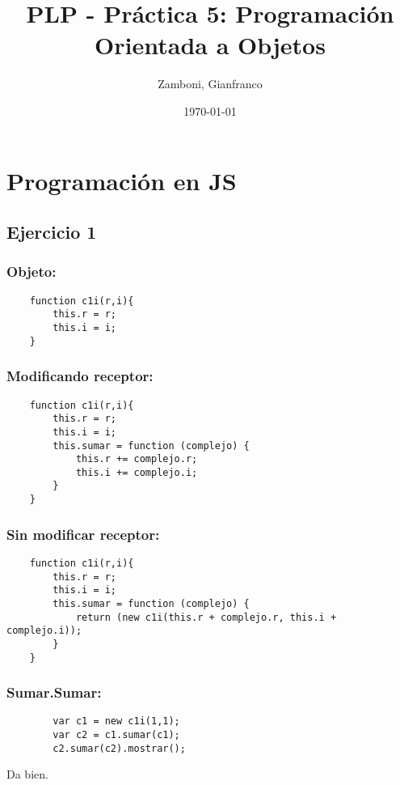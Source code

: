 \documentclass[10pt,a4paper]{article}
\begin{document}
\title{PLP - Práctica 5: Programación Orientada a Objetos}

\date{\today}

\author{Zamboni, Gianfranco}

\maketitle
\setcounter{page}{1}

\section*{\centering Programación en JS}
\subsection{Ejercicio 1}
\subsubsection{Objeto:}
    \begin{lstlisting}
    function c1i(r,i){
    	this.r = r;
    	this.i = i;
    }
    \end{lstlisting}
\subsubsection{Modificando receptor:}
    \begin{lstlisting}
    function c1i(r,i){
    	this.r = r;
    	this.i = i;
    	this.sumar = function (complejo) {
    		this.r += complejo.r;
    		this.i += complejo.i;
    	}
    }
    \end{lstlisting}
\subsubsection{Sin modificar receptor:}
    \begin{lstlisting}
    function c1i(r,i){
    	this.r = r;
    	this.i = i;
    	this.sumar = function (complejo) {
            return (new c1i(this.r + complejo.r, this.i + complejo.i));
    	}
    }
    \end{lstlisting}
\subsubsection{Sumar.Sumar:}
    \begin{lstlisting}
        var c1 = new c1i(1,1);
        var c2 = c1.sumar(c1);
        c2.sumar(c2).mostrar();
    \end{lstlisting}
    Da bien.
\end{document}
